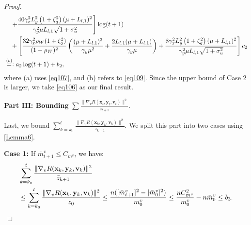 \documentclass{article}
\theoremstyle{plain}
\theoremstyle{definition}
\theoremstyle{remark}
\begin{document}
\begin{proof}
\begin{align}
&\quad\left.+\frac{40\gamma_x^2  L_y^2\left( 1 + \zeta_q^2 \right) (\mu + L_{l,1})^2}{\gamma_y^2\mu L_{l,1}\sqrt{1+\sigma_u^2}}\right]\log(t+1)\nonumber\\
&\quad +\left[\frac{32 \gamma_x^2 \rho_W(1 + \zeta_q^2)}{(1 - \rho_W)^2} \left(\frac{(\mu+L_{l,1})^3}{\gamma_y\mu^2}+\frac{2L_{l,1}(\mu+L_{l,1})}{\gamma_y\mu}\right)+\frac{8\gamma_x^2  L_y^2\left( 1 + \zeta_q^2 \right) (\mu + L_{l,1})^2}{\gamma_y^2\mu L_{l,1}\sqrt{1+\sigma_u^2}}\right]c_2\notag\\
&\overset{(b)}{=}:a_2\log(t+1)+b_2,\label{eq109}
\end{align}
where (a) uses \cref{eq107}, and (b) refers to \cref{eq109}. Since the upper bound of Case 2 is larger, we take \cref{eq106} as our final result.

\textbf{Part III: Bounding} $\sum\frac{\|\nabla_v  R(\mathbf{x}_t, \mathbf{y}_t, \mathbf{v}_t)\|^2}{\bar{z}_{t+1}}$.

Last, we bound $\sum_{k=k_0}^t \frac{\|\nabla_v  R(\mathbf{x}_k, \mathbf{y}_k, \mathbf{v}_k)\|^2}{\bar{z}_{k+1}}$. We split this part into two cases using \cref{Lemma6}.

\textbf{Case 1:} If $\bar{m}^v_{t+1} \leq C_{m^v}$, we have:
\begin{align}
&\sum_{k=k_0}^t \frac{\|\nabla_v  R(\mathbf{x}_k, \mathbf{y}_k, \mathbf{v}_k)\|^2}{\bar{z}_{k+1}}\notag\\
&\leq \sum_{k=k_0}^t \frac{\|\nabla_v  R(\mathbf{x}_k, \mathbf{y}_k, \mathbf{v}_k)\|^2}{\bar{z}_{0}} \leq \frac{n([\bar{m}^v_{t+1}]^2 - [\bar{m}^v_{0}]^2)}{\bar{m}^v_{0}}\leq \frac{nC_{m^v}^2}{\bar{m}^v_{0}} - n\bar{m}^v_{0} \leq b_3.\label{eq110}
\end{align}


\end{proof}
\end{document}
